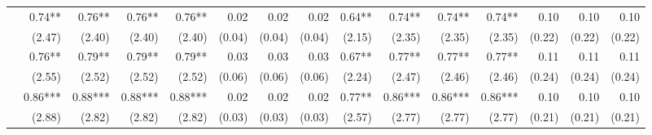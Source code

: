 \begin{tabularx}{1.45\textwidth}{lRRRRRRRRRRRRRR}
		 & \num{0.74}**\phantom{*)} & \num{0.76}**\phantom{*)} & \num{0.76}**\phantom{*)} & \num{0.76}**\phantom{*)} & \num{0.02}\phantom{***)} & \num{0.02}\phantom{***)} & \num{0.02}\phantom{***)} & \num{0.64}**\phantom{*)} & \num{0.74}**\phantom{*)} & \num{0.74}**\phantom{*)} & \num{0.74}**\phantom{*)} & \num{0.10}\phantom{***)} & \num{0.10}\phantom{***)} & \num{0.10}\phantom{***)} \\
		 & (\num{2.47})\phantom{***} & (\num{2.40})\phantom{***} & (\num{2.40})\phantom{***} & (\num{2.40})\phantom{***} & (\num{0.04})\phantom{***} & (\num{0.04})\phantom{***} & (\num{0.04})\phantom{***} & (\num{2.15})\phantom{***} & (\num{2.35})\phantom{***} & (\num{2.35})\phantom{***} & (\num{2.35})\phantom{***} & (\num{0.22})\phantom{***} & (\num{0.22})\phantom{***} & (\num{0.22})\phantom{***} \\ [\dspacing]
		 & \num{0.76}**\phantom{*)} & \num{0.79}**\phantom{*)} & \num{0.79}**\phantom{*)} & \num{0.79}**\phantom{*)} & \num{0.03}\phantom{***)} & \num{0.03}\phantom{***)} & \num{0.03}\phantom{***)} & \num{0.67}**\phantom{*)} & \num{0.77}**\phantom{*)} & \num{0.77}**\phantom{*)} & \num{0.77}**\phantom{*)} & \num{0.11}\phantom{***)} & \num{0.11}\phantom{***)} & \num{0.11}\phantom{***)} \\
		 & (\num{2.55})\phantom{***} & (\num{2.52})\phantom{***} & (\num{2.52})\phantom{***} & (\num{2.52})\phantom{***} & (\num{0.06})\phantom{***} & (\num{0.06})\phantom{***} & (\num{0.06})\phantom{***} & (\num{2.24})\phantom{***} & (\num{2.47})\phantom{***} & (\num{2.46})\phantom{***} & (\num{2.46})\phantom{***} & (\num{0.24})\phantom{***} & (\num{0.24})\phantom{***} & (\num{0.24})\phantom{***} \\ [\dspacing]
		 & \num{0.86}***\phantom{)} & \num{0.88}***\phantom{)} & \num{0.88}***\phantom{)} & \num{0.88}***\phantom{)} & \num{0.02}\phantom{***)} & \num{0.02}\phantom{***)} & \num{0.02}\phantom{***)} & \num{0.77}**\phantom{*)} & \num{0.86}***\phantom{)} & \num{0.86}***\phantom{)} & \num{0.86}***\phantom{)} & \num{0.10}\phantom{***)} & \num{0.10}\phantom{***)} & \num{0.10}\phantom{***)} \\
		 & (\num{2.88})\phantom{***} & (\num{2.82})\phantom{***} & (\num{2.82})\phantom{***} & (\num{2.82})\phantom{***} & (\num{0.03})\phantom{***} & (\num{0.03})\phantom{***} & (\num{0.03})\phantom{***} & (\num{2.57})\phantom{***} & (\num{2.77})\phantom{***} & (\num{2.77})\phantom{***} & (\num{2.77})\phantom{***} & (\num{0.21})\phantom{***} & (\num{0.21})\phantom{***} & (\num{0.21})\phantom{***} \\ [\dspacing]

\end{tabularx}
